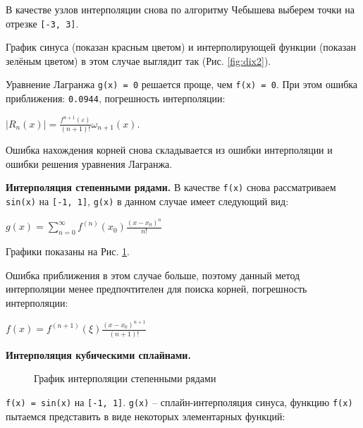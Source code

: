 \documentclass{article}
\begin{document}
				В качестве узлов интерполяции снова по алгоритму Чебышева выберем точки на отрезке \texttt{[-3, 3]}.
				
				График синуса (показан красным цветом) и интерполирующей функции (показан зелёным цветом) в этом случае выглядит так (Рис. \ref{fig:dix2}).
				

				
				Уравнение Лагранжа \texttt{g(x) = 0} решается проще, чем \texttt{f(x) = 0}. При этом ошибка приближения: \texttt{0.0944}, погрешность интерполяции: \begin{center}$|R_n(x)| = \frac{f^{n+1}(\varepsilon)}{(n + 1)!}\omega_{n+1}(x)$.
				\end{center}
				Ошибка нахождения корней снова складывается из ошибки интерполяции и ошибки решения уравнения Лагранжа.
				
				\textbf{Интерполяция степенными рядами.}
				В качестве \texttt{f(x)} снова рассматриваем \texttt{sin(x)} на \texttt{[-1, 1]}, \texttt{g(x)} в данном случае имеет следующий вид: 
	\begin{center}			
				$g(x) = \sum\limits_{n=0}^{\infty}f^{(n)}(x_0)\frac{(x-x_0)^n}{n!}$\end{center}
				
				Графики показаны на Рис. \ref{fig:dix3}.
				
				Ошибка приближения в этом случае больше, поэтому данный метод интерполяции менее предпочтителен для поиска корней, погрешность интерполяции:\begin{center} $f(x) = f^{(n+1)}(\xi)\frac{(x-x_0)^{n+1}}{(n+1)!}$\\
				\end{center}
				\textbf{Интерполяция кубическими сплайнами.}
				
				\begin{figure} 
					\caption{График интерполяции степенными рядами}
					\label{fig:dix3}
				\end{figure}
				\texttt{f(x) = sin(x)} на \texttt{[-1, 1]}. \texttt{g(x)} -- сплайн-интерполяция синуса, функцию \texttt{f(x)} пытаемся представить в виде некоторых элементарных функций:
				
\end{document}
